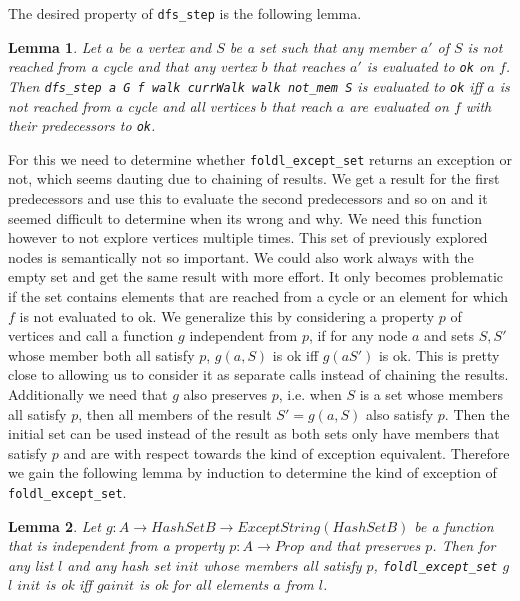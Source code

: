 \documentclass{article}
\newtheorem{lemma}{Lemma}
\begin{document}
        The desired property of \texttt{dfs\_step} is the following lemma.

        \begin{lemma}\label{lem:dfsstep}
            Let $a$ be a vertex and $S$ be a set such that any member $a'$ of $S$ is not reached from a cycle and that any vertex $b$ that reaches $a'$ is evaluated to \texttt{ok} on $f$. Then \texttt{dfs\_step a G f walk currWalk walk not\_mem S} is evaluated to \texttt{ok} iff $a$ is not reached from a cycle and all vertices $b$ that reach $a$ are evaluated on $f$ with their predecessors to \texttt{ok}.
        \end{lemma}

        For this we need to determine whether \texttt{foldl\_except\_set} returns an exception or not, which seems dauting due to chaining of results. We get a result for the first predecessors and use this to evaluate the second predecessors and so on and it seemed difficult to determine when its wrong and why. We need this function however to not explore vertices multiple times. This set of previously explored nodes is semantically not so important. We could also work always with the empty set and get the same result with more effort. It only becomes problematic if the set contains elements that are reached from a cycle or an element for which $f$ is not evaluated to ok. We generalize this by considering a property $p$ of vertices and call a function $g$ independent from $p$, if for any node $a$ and sets $S, S'$ whose member both all satisfy $p$, $g( a, S)$ is ok iff $g( a S')$ is ok. This is pretty close to allowing us to consider it as separate calls instead of chaining the results. Additionally we need that $g$ also preserves $p$, i.e. when $S$ is a set whose members all satisfy $p$, then all members of the result $S' = g(a,S)$ also satisfy $p$. Then the initial set can be used instead of the result as both sets only have members that satisfy $p$ and are with respect towards the kind of exception equivalent. Therefore we gain the following lemma by induction to determine the kind of exception of \texttt{foldl\_except\_set}.

        \begin{lemma}\label{lem:fes_ok}
            Let $g: A \to HashSet B \to Except String (HashSet B)$ be a function that is independent from a property $p: A \to Prop$ and that preserves $p$. Then for any list $l$ and any hash set $init$ whose members all satisfy $p$, \texttt{foldl\_except\_set} $g$ $l$ $init$ is ok iff $g a init$ is ok for all elements $a$ from $l$.
        \end{lemma}
\end{document}
